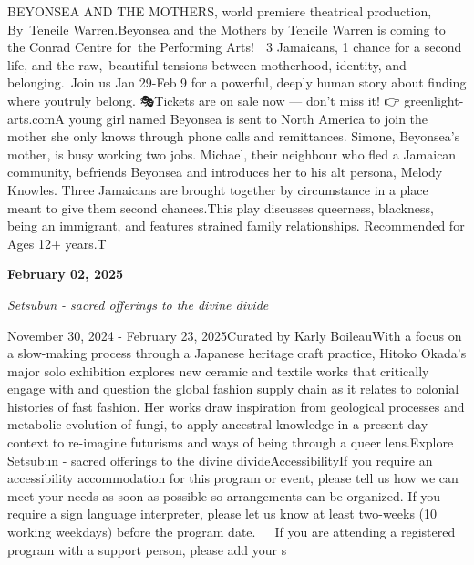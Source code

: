 \documentclass[letterpaper, 10pt]{article}
\newcommand{\headline}[1]{\textbf{\Large #1}\vspace{0.5em}}
\newcommand{\subtitle}[1]{\textit{\large #1}\vspace{0.5em}}
\newcommand{\articlecontent}[1]{\small #1\vspace{1em}}
\begin{document}
\begin{multicols}{2}
{
\vspace{10px}

BEYONSEA AND THE MOTHERS, world premiere theatrical production, By Teneile Warren.Beyonsea and the Mothers by Teneile Warren is coming to the Conrad Centre for the Performing Arts! 🥭 3 Jamaicans, 1 chance for a second life, and the raw, beautiful tensions between motherhood, identity, and belonging. Join us Jan 29-Feb 9 for a powerful, deeply human story about finding where youtruly belong. 🎭Tickets are on sale now — don’t miss it! 👉 greenlight-arts.comA young girl named Beyonsea is sent to North America to join the mother she only knows through phone calls and remittances. Simone, Beyonsea’s mother, is busy working two jobs. Michael, their neighbour who fled a Jamaican community, befriends Beyonsea and introduces her to his alt persona, Melody Knowles. Three Jamaicans are brought together by circumstance in a place meant to give them second chances.This play discusses queerness, blackness, being an immigrant, and features strained family relationships. Recommended for Ages 12+ years.T
}
\vspace{10px}

\headline{February 02, 2025}

\subtitle{Setsubun - sacred offerings to the divine divide}

\articlecontent{

\qrcode[height=1.5cm]{https://ideaexchange.libnet.info/event/11297391}
\vspace{10px}

November 30, 2024 - February 23, 2025Curated by Karly BoileauWith a focus on a slow-making process through a Japanese heritage craft practice, Hitoko Okada’s major solo exhibition explores new ceramic and textile works that critically engage with and question the global fashion supply chain as it relates to colonial histories of fast fashion. Her works draw inspiration from geological processes and metabolic evolution of fungi, to apply ancestral knowledge in a present-day context to re-imagine futurisms and ways of being through a queer lens.Explore Setsubun - sacred offerings to the divine divideAccessibilityIf you require an accessibility accommodation for this program or event, please tell us how we can meet your needs as soon as possible so arrangements can be organized. If you require a sign language interpreter, please let us know at least two-weeks (10 working weekdays) before the program date.   If you are attending a registered program with a support person, please add your s
}
\vspace{10px}


\end{multicols}
\end{document}
